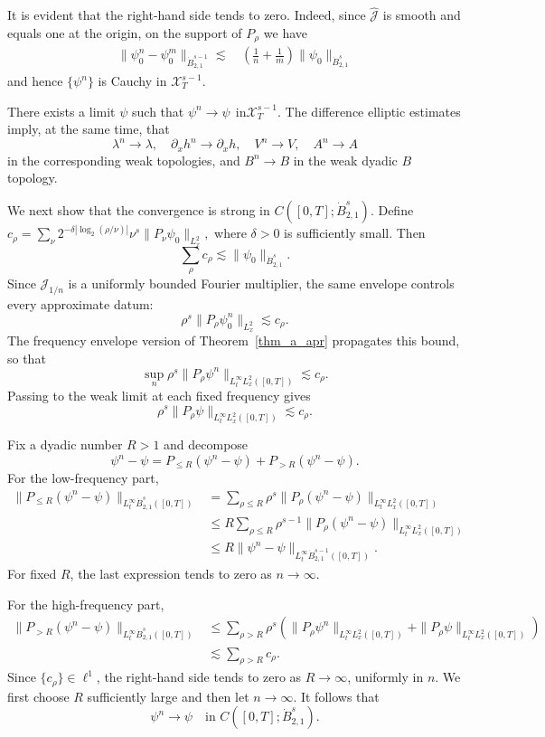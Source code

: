 \documentclass[11pt,letterpaper,reqno]{amsart}
\numberwithin{equation}{section}
\theoremstyle{definition}
\theoremstyle{remark}
\begin{document}
It is evident that the right-hand side tends to zero. Indeed, since
\(\widehat{\mathcal J}\) is smooth and equals one at the origin, on the
support of \(P_\rho\) we have
\begin{align*}
 \|\psi_0^n-\psi_0^m\|_{\dot B^{s-1}_{2,1}}
\lesssim &\,
\left(
\frac1n+\frac1m
\right)
\|\psi_0\|_{\dot B^s_{2,1}}
\end{align*}
and hence \(\{\psi^n\}\) is Cauchy in \(\mathcal X_T^{s-1}\).

There exists a limit \(\psi\) such that
\(
\psi^n
\longrightarrow
\psi
~~
\text{in}\mathcal X_T^{s-1}.
\)
The difference elliptic estimates imply, at the same time, that
\[
\lambda^n\longrightarrow\lambda,
\quad
\partial_x h^n\longrightarrow\partial_x h,
\quad
V^n\longrightarrow V,
\quad
A^n\longrightarrow A
\]
in the corresponding weak topologies, and
\(
B^n\longrightarrow B
\)
in the weak dyadic \(B\) topology.


We next show that the convergence is strong in
\(
C([0,T];\dot B^s_{2,1}).
\)
Define
\(
c_\rho
=
\sum_\nu
2^{-\delta|\log_2(\rho/\nu)|} \nu^s\|P_\nu\psi_0\|_{L_x^2},
\)
where \(\delta>0\) is sufficiently small. Then
\[
\sum_\rho c_\rho
\lesssim
\|\psi_0\|_{\dot B^s_{2,1}}.
\]
Since \(\mathcal J_{1/n}\) is a uniformly bounded Fourier multiplier, the
same envelope controls every approximate datum:
\[
\rho^s\|P_\rho\psi_0^n\|_{L_x^2}
\lesssim
c_\rho.
\]
The frequency envelope version of Theorem~\ref{thm_a_apr} propagates this
bound, so that
\[
\sup_n
\rho^s
\|P_\rho\psi^n\|_{L_t^\infty L_x^2([0,T])}
\lesssim
c_\rho.
\]
Passing to the weak limit at each fixed frequency gives
\[
\rho^s
\|P_\rho\psi\|_{L_t^\infty L_x^2([0,T])}
\lesssim
c_\rho.
\]

Fix a dyadic number \(R>1\) and decompose
\[
\psi^n-\psi
=
P_{\leq R}(\psi^n-\psi)
+
P_{>R}(\psi^n-\psi).
\]
For the low-frequency part,
\begin{align}
\|P_{\leq R}(\psi^n-\psi)\|_{L_t^\infty\dot B^s_{2,1}([0,T])}
&=
\sum_{\rho\leq R}
\rho^s
\|P_\rho(\psi^n-\psi)\|_{L_t^\infty L_x^2([0,T])}
\nonumber\\
&\leq
R
\sum_{\rho\leq R}
\rho^{s-1}
\|P_\rho(\psi^n-\psi)\|_{L_t^\infty L_x^2([0,T])}
\nonumber\\
&\leq
R
\|\psi^n-\psi\|_{L_t^\infty\dot B^{s-1}_{2,1}([0,T])}.
\label{eq:low-frequency-critical-upgrade}
\end{align}
For fixed \(R\), the last expression tends to zero as \(n\to\infty\).

For the high-frequency part,
\begin{align}
\|P_{>R}(\psi^n-\psi)\|_{L_t^\infty\dot B^s_{2,1}([0,T])}
&\leq
\sum_{\rho>R}
\rho^s
\left(
\|P_\rho\psi^n\|_{L_t^\infty L_x^2([0,T])}
+
\|P_\rho\psi\|_{L_t^\infty L_x^2([0,T])}
\right)
\nonumber\\
&\lesssim
\sum_{\rho>R}c_\rho.
\label{eq:high-frequency-critical-tail}
\end{align}
Since \(\{c_\rho\}\in\ell^1\), the right-hand side tends to zero as
\(R\to\infty\), uniformly in \(n\). We first choose \(R\) sufficiently large
and then let \(n\to\infty\). It follows that
\[
\psi^n
\longrightarrow
\psi
\quad
\text{in }C([0,T];\dot B^s_{2,1}).
\]
\end{document}
